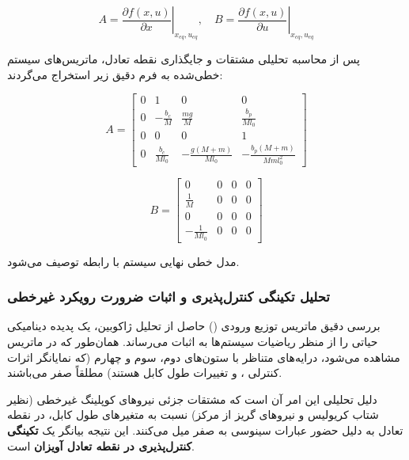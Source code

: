 \begin{equation}
    A = \left. \frac{\partial f(x,u)}{\partial x} \right|_{x_{eq}, u_{eq}}, \quad B = \left. \frac{\partial f(x,u)}{\partial u} \right|_{x_{eq}, u_{eq}}
\end{equation}

پس از محاسبه تحلیلی مشتقات و جایگذاری نقطه تعادل، ماتریس‌های سیستم خطی‌شده به فرم دقیق زیر استخراج می‌گردند:

\begin{equation}
    \renewcommand{\arraystretch}{1.8}
    A = \begin{bmatrix}
        0 & 1                 & 0                     & 0                           \\
        0 & -\frac{b_c}{M}    & \frac{mg}{M}          & \frac{b_p}{M l_0}           \\
        0 & 0                 & 0                     & 1                           \\
        0 & \frac{b_c}{M l_0} & -\frac{g(M+m)}{M l_0} & -\frac{b_p(M+m)}{M m l_0^2}
    \end{bmatrix}
\end{equation}

\begin{equation}
    \renewcommand{\arraystretch}{1.8}
    B = \begin{bmatrix}
        0                & 0 & 0 & 0 \\
        \frac{1}{M}      & 0 & 0 & 0 \\
        0                & 0 & 0 & 0 \\
        -\frac{1}{M l_0} & 0 & 0 & 0
    \end{bmatrix}
\end{equation}

مدل خطی نهایی سیستم با رابطه  توصیف می‌شود.

\subsubsection{تحلیل تکینگی کنترل‌پذیری و اثبات ضرورت رویکرد غیرخطی}

بررسی دقیق ماتریس توزیع ورودی () حاصل از تحلیل ژاکوبین، یک پدیده دینامیکی حیاتی را از منظر ریاضیات سیستم‌ها به اثبات می‌رساند. همان‌طور که در ماتریس  مشاهده می‌شود، درایه‌های متناظر با ستون‌های دوم، سوم و چهارم (که نمایانگر اثرات کنترلی ،  و تغییرات طول کابل هستند) مطلقاً صفر می‌باشند.

دلیل تحلیلی این امر آن است که مشتقات جزئی نیروهای کوپلینگ غیرخطی (نظیر شتاب کریولیس و نیروهای گریز از مرکز) نسبت به متغیرهای طول کابل، در نقطه تعادل  به دلیل حضور عبارات سینوسی به صفر میل می‌کنند. این نتیجه بیانگر یک \textbf{تکینگی کنترل‌پذیری در نقطه تعادل آویزان} است.

